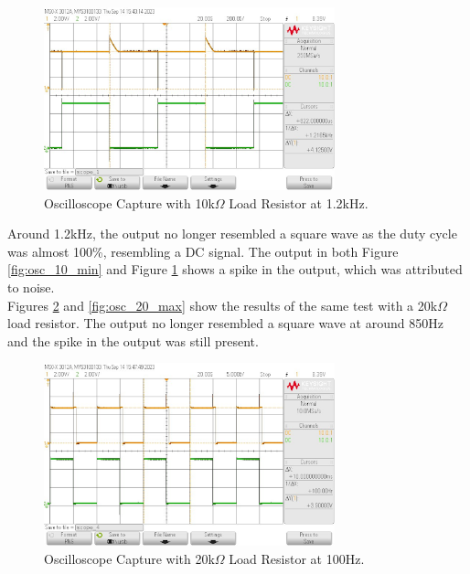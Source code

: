 \documentclass[CMPE]{KGCOEReport}
\begin{document}
\begin{figure}[H]
    \centering
    \includegraphics[width=0.75\textwidth]{output_max_10.png}
    \caption{Oscilloscope Capture with 10k$\Omega$ Load Resistor at 1.2kHz.}
    \label{fig:osc_10_max}
\end{figure}

Around 1.2kHz, the output no longer resembled a square wave as the duty cycle was almost 100\%, resembling a DC signal. The output in both Figure \ref{fig:osc_10_min} and Figure \ref{fig:osc_10_max} shows a spike in the output, which was attributed to noise. \\

Figures \ref{fig:osc_20_min} and \ref{fig:osc_20_max} show the results of the same test with a 20k$\Omega$ load resistor. The output no longer resembled a square wave at around 850Hz and the spike in the output was still present.

\begin{figure}[H]
    \centering
    \includegraphics[width=0.75\textwidth]{output_min_20.png}
    \caption{Oscilloscope Capture with 20k$\Omega$ Load Resistor at 100Hz.}
    \label{fig:osc_20_min}
\end{figure}
\end{document}
